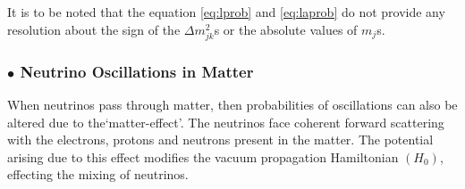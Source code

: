It is to be noted that the equation \ref{eq:lprob} and \ref{eq:laprob} do not provide any resolution about the sign of the $\Delta m_{jk}^{2}$s or the absolute values of $m_{j}$s.

\subsubsection{$\bullet$ Neutrino Oscillations in Matter}

When neutrinos pass through matter, then probabilities of oscillations can also be altered due to the`matter-effect'. The neutrinos face coherent forward scattering with the electrons, protons and neutrons present in the matter\cite{mattereffect}. The potential arising due to this effect modifies the vacuum propagation Hamiltonian $\left(H_{0}\right)$, effecting the mixing of neutrinos.

